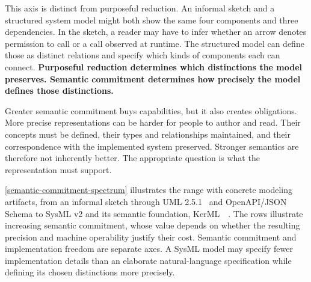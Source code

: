 
This axis is distinct from purposeful reduction. An informal sketch and a structured system model might both show the same four components and three dependencies. In the sketch, a reader may have to infer whether an arrow denotes permission to call or a call observed at runtime. The structured model can define those as distinct relations and specify which kinds of components each can connect. \textbf{Purposeful reduction determines which distinctions the model preserves. Semantic commitment determines how precisely the model defines those distinctions.}


Greater semantic commitment buys capabilities, but it also creates obligations. More precise representations can be harder for people to author and read. Their concepts must be defined, their types and relationships maintained, and their correspondence with the implemented system preserved. Stronger semantics are therefore not inherently better. The appropriate question is what the representation must support.


\autoref{semantic-commitment-spectrum} illustrates the range with concrete modeling artifacts, from an informal sketch through UML 2.5.1~\citep{omg2017uml} and OpenAPI/JSON Schema to SysML v2 and its semantic foundation, KerML~\citep{omg2025sysml}~\citep{omg2025kerml}. The rows illustrate increasing semantic commitment, whose value depends on whether the resulting precision and machine operability justify their cost. Semantic commitment and implementation freedom are separate axes. A SysML model may specify fewer implementation details than an elaborate natural-language specification while defining its chosen distinctions more precisely.

